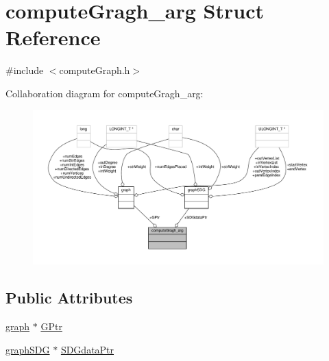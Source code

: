 \hypertarget{structcomputeGragh__arg}{\section{compute\-Gragh\-\_\-arg Struct Reference}
\label{structcomputeGragh__arg}
}


{\ttfamily \#include $<$compute\-Graph.\-h$>$}



Collaboration diagram for compute\-Gragh\-\_\-arg\-:
\nopagebreak
\begin{figure}[H]
\begin{center}
\leavevmode
\includegraphics[width=350pt]{structcomputeGragh__arg__coll__graph}
\end{center}
\end{figure}
\subsection*{Public Attributes}
\begin{DoxyCompactItemize}
\item 
\hyperlink{structgraph}{graph} $\ast$ \hyperlink{structcomputeGragh__arg_a9d0cd599ed393a81a669afdd4a7a6cf4}{G\-Ptr}
\item 
\hyperlink{structgraphSDG}{graph\-S\-D\-G} $\ast$ \hyperlink{structcomputeGragh__arg_aeb45648df09de22d22f78307f7c479b2}{S\-D\-Gdata\-Ptr}
\end{DoxyCompactItemize}


